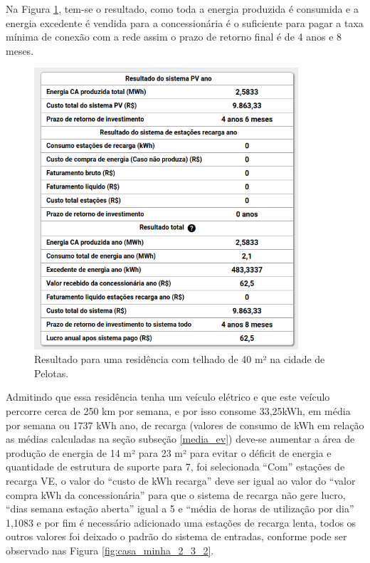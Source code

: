 Na Figura \ref{fig:casa_minha_1_2}, tem-se o resultado, como toda a energia produzida é consumida e a energia excedente é vendida para a concessionária é o suficiente para pagar a taxa mínima de conexão com a rede assim o prazo de retorno final é de 4 anos e 8 meses.

\begin{figure}[H]
    \centering
    \includegraphics[width=0.875\textwidth]{./Figuras/casa_minha_1_2.png}
    \caption{Resultado para uma residência com telhado de 40 m² na cidade de Pelotas.}
   \label{fig:casa_minha_1_2}
\end{figure}

Admitindo que essa residência tenha um veículo elétrico e que este veículo percorre cerca de 250 km por semana, e por isso consome 33,25kWh, em média por semana ou 1737 kWh ano, de recarga (valores de consumo de kWh em relação as médias calculadas na seção subseção \ref{media_ev}) deve-se aumentar a área de produção de energia de 14 m² para 23 m² para evitar o déficit de energia e quantidade de estrutura de suporte para 7, foi selecionada ``Com'' estações de recarga VE, o valor do ``custo de kWh recarga''  deve ser igual ao valor do ``valor compra kWh da concessionária'' para que o sistema de recarga não gere lucro, ``dias semana estação aberta'' igual a 5 e  ``média de horas de utilização por dia'' 1,1083 e por fim é necessário adicionado uma estações de recarga lenta, todos os outros valores foi deixado o padrão do sistema de entradas, conforme pode ser observado nas Figura \ref{fig:casa_minha_2_3_2}.

